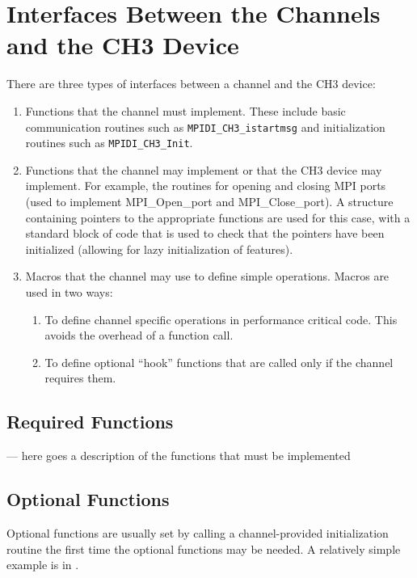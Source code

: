 \documentclass{report}
\begin{document}
\section{Interfaces Between the Channels and the CH3 Device}
There are three types of interfaces between a channel and the CH3 device:
\begin{enumerate}
  \item Functions that the channel must implement.  These include
  basic communication routines such as \texttt{MPIDI_CH3\_istartmsg}
  and initialization routines such as \texttt{MPIDI_CH3_Init}.  

  \item Functions that the channel may implement or that the CH3
  device may implement.  For example, the routines for opening and
  closing MPI ports (used to implement MPI_Open_port and
  MPI_Close_port).  A structure containing pointers to the appropriate
  functions are used for this case, with a standard block of code that
  is used to check that the pointers have been initialized (allowing
  for lazy initialization of features).

  \item Macros that the channel may use to define simple operations.
  Macros are used in two ways:
  \begin{enumerate}
    \item To define channel specific operations in performance
    critical code.  This avoids the overhead of a function call.
    \item To define optional ``hook'' functions that are called only
    if the channel requires them.  
  \end{enumerate}
\end{enumerate}

\subsection{Required Functions}
--- here goes a description of the functions that must be implemented

\subsection{Optional Functions}

Optional functions are usually set by calling a channel-provided
initialization routine the first time the optional functions may be
needed.  A relatively simple example is in .  
\end{document}
